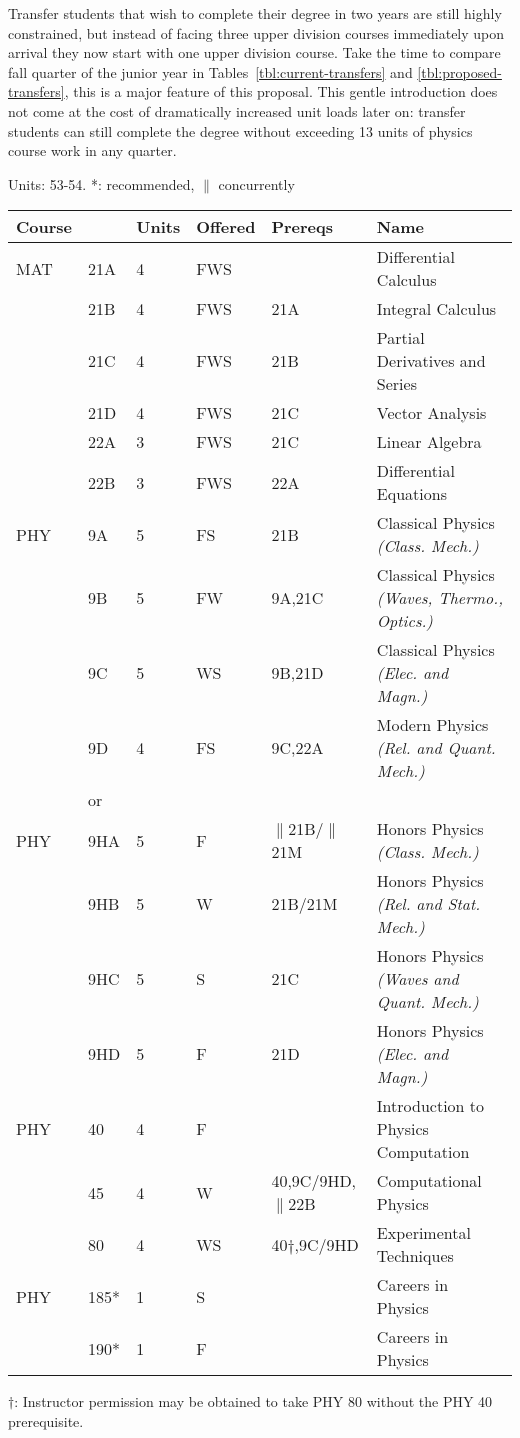 \documentclass[12pt]{article}
\begin{document}
Transfer students that wish to complete their degree in two years are
still highly constrained, but instead of facing three upper division
courses immediately upon arrival they now start with one upper
division course.  Take the time to compare fall quarter of the junior
year in Tables~\ref{tbl:current-transfers} and
\ref{tbl:proposed-transfers}, this is a major feature of this
proposal.  This gentle introduction does not come at the cost of
dramatically increased unit loads later on: transfer students can
still complete the degree without exceeding 13 units of physics
course work in any quarter.

\vskip 2cm
\noindent
\vskip 0.25cm
Units:  53-54. *: recommended, $\parallel$ concurrently\\
\begin{tabular}{|llllll|}
\hline
Course & & Units & Offered & Prereqs & Name \\
\hline
MAT & 21A & 4 & FWS & & Differential Calculus\\ 
    & 21B & 4 & FWS & 21A & Integral Calculus \\ 
    & 21C & 4 & FWS & 21B & Partial Derivatives and Series\\ 
    & 21D & 4 & FWS & 21C & Vector Analysis\\ 
    & 22A & 3 & FWS & 21C & Linear Algebra\\ 
    & 22B & 3 & FWS & 22A & Differential Equations\\ 
\hline
\hline

PHY & 9A & 5 & FS & 21B & Classical Physics {\it (Class. Mech.)}\\ 
    & 9B & 5 & FW & 9A,21C & Classical Physics {\it (Waves, Thermo., Optics.)}\\ 
    & 9C & 5 & WS & 9B,21D & Classical Physics {\it (Elec. and Magn.)}\\ 
    & 9D & 4 & FS & 9C,22A & Modern Physics {\it (Rel. and Quant. Mech.)}\\ 
\hline
&or&&\\
\hline
PHY & 9HA & 5 & F & $\parallel$21B/$\parallel$21M & Honors Physics {\it (Class. Mech.)}\\ 
    & 9HB & 5 & W & 21B/21M & Honors Physics {\it (Rel. and Stat. Mech.)}\\ 
    & 9HC & 5 & S & 21C & Honors Physics {\it (Waves and Quant. Mech.)}\\ 
    & 9HD & 5 & F & 21D & Honors Physics {\it (Elec. and Magn.)}\\ 
\hline
\hline
PHY & 40  & 4 & F & & Introduction to Physics Computation \\ 
    & 45  & 4 & W & 40,9C/9HD,$\parallel$22B & Computational Physics\\ 
    & 80  & 4 & WS & 40$\dagger$,9C/9HD     & Experimental Techniques \\
PHY & 185* & 1 & S & & Careers in Physics \\ 
    & 190* & 1 & F & & Careers in Physics \\ 
\hline
\end{tabular}
$\dagger$:  Instructor permission may be obtained to take PHY 80 without the PHY 40 prerequisite.
\end{document}
